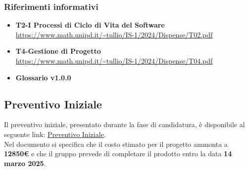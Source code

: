 \subsubsection{Riferimenti informativi}
\begin{itemize}
    \item \textbf{T2-I Processi di Ciclo di Vita del Software} \\
    \url{https://www.math.unipd.it/~tullio/IS-1/2024/Dispense/T02.pdf}
    \item \textbf{T4-Gestione di Progetto} \\
    \url{https://www.math.unipd.it/~tullio/IS-1/2024/Dispense/T04.pdf}
    \item \textbf{Glossario v1.0.0} 
\end{itemize}


\subsection{Preventivo Iniziale}
Il preventivo iniziale, presentato durante la fase di candidatura, è disponibile al seguente link: \href{https://pebkac-swe-group-11.github.io/assets/pdf/Preventivo_Costi_Assunzione_Impegni_V2.0.0.pdf}{Preventivo Iniziale}.\\Nel documento si specifica che il costo stimato per il progetto ammonta a \textbf{12850€} e che il gruppo prevede di completare il prodotto entro la data \textbf{14 marzo 2025}.